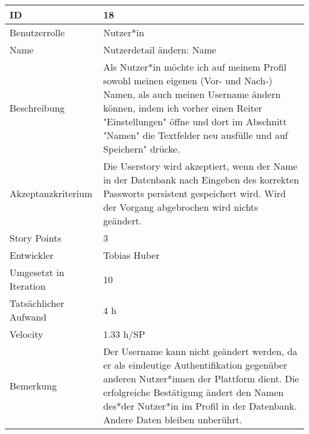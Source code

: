 \begin{tabularx}{\textwidth}{|p{}|X|}
	\hline
	ID & 18\\
	\hline
	Benutzerrolle & Nutzer*in\\
	\hline
	Name & Nutzerdetail ändern: Name\\
	\hline
	Beschreibung & Als Nutzer*in möchte ich auf meinem Profil sowohl meinen eigenen (Vor- und Nach-) Namen, als auch meinen Username ändern können, indem ich vorher einen Reiter "Einstellungen" öffne und dort im Abschnitt "Namen" die Textfelder neu ausfülle und auf Speichern" drücke.\\
	\hline
	Akzeptanzkriterium & Die Userstory wird akzeptiert, wenn der Name in der Datenbank nach Eingeben des korrekten Passworts persistent gespeichert wird. Wird der Vorgang abgebrochen wird nichts geändert.\\
	\hline
	Story Points & 3\\
	\hline
	Entwickler & Tobias Huber\\
	\hline
	Umgesetzt in Iteration & 10\\ 
	\hline
	Tatsächlicher Aufwand & 4 h\\
	\hline
	Velocity & 1.33 h/SP\\
	\hline
	Bemerkung & Der Username kann nicht geändert werden, da er als eindeutige Authentifikation gegenüber anderen Nutzer*innen der Plattform dient. Die erfolgreiche Bestätigung ändert den Namen des*der Nutzer*in im Profil in der Datenbank. Andere Daten bleiben unberührt.\\
	\hline
\end{tabularx}
\vspace{20pt}
